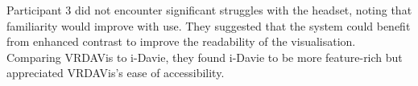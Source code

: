 


Participant 3 did not encounter significant struggles with the headset, noting that familiarity would improve with use. 
They suggested that the system could benefit from enhanced contrast to improve the readability of the visualisation. 
Comparing VRDAVis to i-Davie, they found i-Davie to be more feature-rich but appreciated VRDAVis’s ease of accessibility. 





